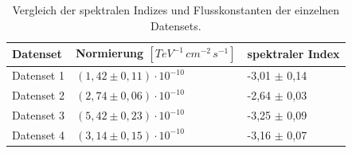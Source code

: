 \begin{table}[!h]
\centering
\caption{Vergleich der spektralen Indizes und Flusskonstanten der einzelnen Datensets.}
\label{tab:SpektraleIndizes}
\begin{tabular}{lll}
  \toprule
  Datenset & Normierung $\left[\si{TeV^{-1}\,cm^{-2}\,s^{-1}}\right]$ & spektraler Index\\
  \midrule
  \midrule
Datenset 1 & $(1,42\pm 0,11)\cdot 10^{-10}$ & -3,01 $\pm$ 0,14 \\
Datenset 2 & $(2,74\pm 0,06)\cdot 10^{-10}$ & -2,64 $\pm$ 0,03 \\
Datenset 3 & $(5,42\pm 0,23)\cdot 10^{-10}$ & -3,25 $\pm$ 0,09 \\
Datenset 4 & $(3,14\pm 0,15)\cdot 10^{-10}$ & -3,16 $\pm$ 0,07 \\
  \bottomrule
\end{tabular}
\end{table}

